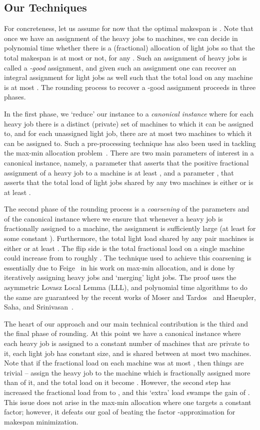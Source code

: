 \documentclass[11pt]{article}
\begin{document}
\subsection{Our Techniques}
For concreteness, let us assume for now that the optimal makespan is .
Note that once we have an assignment of the heavy jobs to machines, we can decide in polynomial time whether there is a (fractional) allocation of light jobs so that the total makespan is at most  or not, for any . Such an assignment of heavy jobs is called a {\em -good} assignment, and given such an assignment one can recover an integral assignment for light jobs as well such that the total load on any machine is at most . 
The rounding process to recover a -good assignment proceeds in three phases. 

In the first phase, we `reduce' our instance to a {\em canonical instance} where for each heavy job there is a distinct (private) set of machines to which it can be assigned to, and for each unassigned light job, there are at most  two machines to which it can be assigned to. Such a  pre-processing technique has also been used in 
tackling the max-min allocation problem~\cite{BS06,CCK09}. There are two main parameters of interest in a canonical instance, namely, a parameter  that asserts that the positive fractional assignment of a heavy job to a machine is at least , and a parameter , that asserts that the total load of light jobs shared by any two machines is either  or is at least .

The second phase of the rounding process is a {\em coarsening} of the parameters  and  of the canonical instance where we ensure that whenever a heavy job is fractionally assigned to a machine, the assignment is sufficiently large (at least  for some constant ). Furthermore, the total light load shared by any pair machines is either  or at least  . The flip side is the total fractional load on a single machine could increase from  to roughly .
The technique used to achieve this coarsening is essentially due to Feige~\cite{Fei08} in his work on max-min allocation, and is done by iteratively assigning heavy jobs and `merging' light jobs. The proof uses the asymmetric Lovasz Local Lemma (LLL), and 
polynomial time algorithms to do the same are guaranteed by the recent works of Moser and Tardos~\cite{MT10} and Haeupler, Saha, and Srinivasan~\cite{HSS11}.


The heart of our approach and our main technical contribution is the third and the final phase of rounding. At this point we have a canonical instance where each heavy job is assigned to a constant number  of machines that are private to it, each light job has constant size, and is shared between at most  two machines. Note that if the fractional load on each machine was at most , then things are trivial -- assign the heavy job to the machine which is fractionally assigned more than  of it, and the total load on it become . 
However, the second step has increased the fractional load from  to , and this `extra' load swamps the gain of .
This issue does not arise in the max-min allocation where one targets a constant factor; however, it defeats our goal of beating the 
factor -approximation for makespan minimization.
\end{document}
